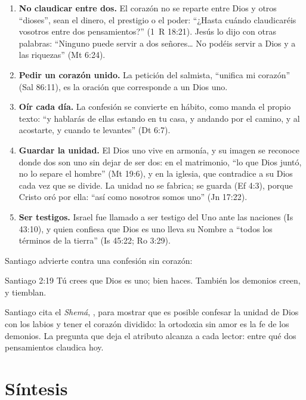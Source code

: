 \begin{enumerate}
\item \textbf{No claudicar entre dos.} El corazón no se reparte entre Dios y otros ``dioses'', sean el dinero, el prestigio o el poder: ``¿Hasta cuándo claudicaréis vosotros entre dos pensamientos?'' (1~R 18:21). Jesús lo dijo con otras palabras: ``Ninguno puede servir a dos señores\ldots{} No podéis servir a Dios y a las riquezas'' (Mt 6:24).
\item \textbf{Pedir un corazón unido.} La petición del salmista, ``unifica mi corazón'' (Sal 86:11), es la oración que corresponde a un Dios uno.
\item \textbf{Oír cada día.} La confesión se convierte en hábito, como manda el propio texto: ``y hablarás de ellas estando en tu casa, y andando por el camino, y al acostarte, y cuando te levantes'' (Dt 6:7).
\item \textbf{Guardar la unidad.} El Dios uno vive en armonía, y su imagen se reconoce donde dos son uno sin dejar de ser dos: en el matrimonio, ``lo que Dios juntó, no lo separe el hombre'' (Mt 19:6), y en la iglesia, que contradice a su Dios cada vez que se divide. La unidad no se fabrica; se guarda (Ef 4:3), porque Cristo oró por ella: ``así como nosotros somos uno'' (Jn 17:22).
\item \textbf{Ser testigos.} Israel fue llamado a ser testigo del Uno ante las naciones (Is 43:10), y quien confiesa que Dios es uno lleva su Nombre a ``todos los términos de la tierra'' (Is 45:22; Ro 3:29).
\end{enumerate}

Santiago advierte contra una confesión sin corazón:

\begin{verso}{Santiago 2:19}
Tú crees que Dios es uno; bien haces. También los demonios creen, y tiemblan.
\end{verso}

Santiago cita el \emph{Shemá}, , para mostrar que es posible confesar la unidad de Dios con los labios y tener el corazón dividido: la ortodoxia sin amor es la fe de los demonios. La pregunta que deja el atributo alcanza a cada lector: entre qué dos pensamientos claudica hoy.

\section{Síntesis}

